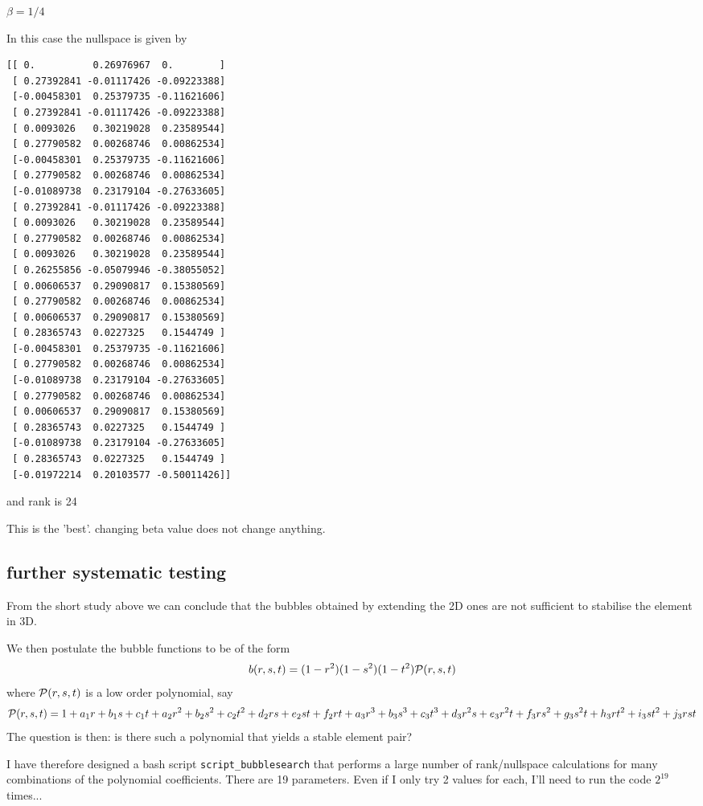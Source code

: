 $\beta=1/4$

In this case the nullspace is given by
\begin{tiny}
\begin{verbatim}
[[ 0.          0.26976967  0.        ]
 [ 0.27392841 -0.01117426 -0.09223388]
 [-0.00458301  0.25379735 -0.11621606]
 [ 0.27392841 -0.01117426 -0.09223388]
 [ 0.0093026   0.30219028  0.23589544]
 [ 0.27790582  0.00268746  0.00862534]
 [-0.00458301  0.25379735 -0.11621606]
 [ 0.27790582  0.00268746  0.00862534]
 [-0.01089738  0.23179104 -0.27633605]
 [ 0.27392841 -0.01117426 -0.09223388]
 [ 0.0093026   0.30219028  0.23589544]
 [ 0.27790582  0.00268746  0.00862534]
 [ 0.0093026   0.30219028  0.23589544]
 [ 0.26255856 -0.05079946 -0.38055052]
 [ 0.00606537  0.29090817  0.15380569]
 [ 0.27790582  0.00268746  0.00862534]
 [ 0.00606537  0.29090817  0.15380569]
 [ 0.28365743  0.0227325   0.1544749 ]
 [-0.00458301  0.25379735 -0.11621606]
 [ 0.27790582  0.00268746  0.00862534]
 [-0.01089738  0.23179104 -0.27633605]
 [ 0.27790582  0.00268746  0.00862534]
 [ 0.00606537  0.29090817  0.15380569]
 [ 0.28365743  0.0227325   0.1544749 ]
 [-0.01089738  0.23179104 -0.27633605]
 [ 0.28365743  0.0227325   0.1544749 ]
 [-0.01972214  0.20103577 -0.50011426]]
\end{verbatim}
\end{tiny}

and rank is 24

This is the 'best'. changing beta value does not change anything. 

\subsection*{further systematic testing}
From the short study above we can conclude that the 
bubbles obtained by extending the 2D ones are 
not sufficient to stabilise the element in 3D.

We then postulate the bubble functions to be of the form
\[
b(r,s,t) = (1-r^2)(1-s^2)(1-t^2) {\cal P}(r,s,t)
\]
where ${\cal P}(r,s,t)$ is a low order polynomial, say
\[
{\cal P}(r,s,t) =  
1 + a_1r + b_1s + c_1t +
a_2 r^2  + b_2 s^2 + c_2 t^2 + 
d_2 rs   + e_2st + f_2rt +
a_3 r^3  + b_3 s^3 + c_3 t^3 + d_3 r^2s + e_3 r^2 t + f_3 r s^2 + g_3 s^2 t +
h_3 rt^2 + i_3 st^2 + j_3 rst
\] 
The question is then: is there such a polynomial that 
yields a stable element pair? 

I have therefore designed a bash script {\tt script\_bubblesearch}
that performs a large number of rank/nullspace calculations 
for many combinations of the polynomial coefficients.
There are 19 parameters. Even if I only try 2 values for each, I'll need to run
the code $2^{19}$ times... 

